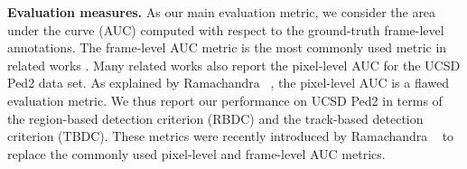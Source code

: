 \documentclass[final]{cvpr}
\begin{document}
\noindent
{\bf Evaluation measures.}
As our main evaluation metric, we consider the area under the curve (AUC) computed with respect to the ground-truth frame-level annotations. The frame-level AUC metric is the most commonly used metric in related works \cite{Giorno-ECCV-2016,Gong-ICCV-2019,Hasan-CVPR-2016,Hinami-ICCV-2017,Ionescu-CVPR-2019,Liu-CVPR-2018,Ramachandra-ArXiv-2020,Ravanbakhsh-ICIP-2017,Vu-AAAI-2019,Wang-ACMMM-2020,Zaheer-CVPR-2020}. Many related works also report the pixel-level AUC for the UCSD Ped2 data set. As explained by Ramachandra \etal~\cite{Ramachandra-WACV-2020a}, the pixel-level AUC is a flawed evaluation metric. We thus report our performance on UCSD Ped2 in terms of the region-based detection criterion (RBDC) and the track-based detection criterion (TBDC). These metrics were recently introduced by Ramachandra \etal~\cite{Ramachandra-WACV-2020a} to replace the commonly used pixel-level and frame-level AUC metrics.
\end{document}
